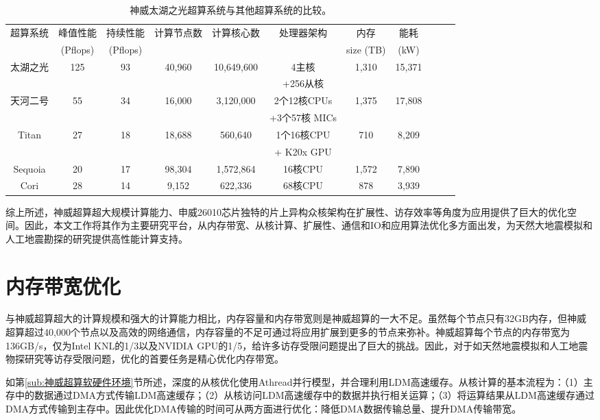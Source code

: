 \documentclass[degree=doctor]{thuthesis}
\begin{document}
\begin{table}[ht]
\footnotesize
\caption{神威太湖之光超算系统与其他超算系统的比较。}
\label{tb:system-comp}
\begin{tabular*}{\textwidth}{ccccccccccc}
\hline\hline
  超算系统 & 峰值性能 & 持续性能 & 计算节点数 & 计算核心数 & 处理器架构 & 内存 & 能耗\\
  & (Pflops) & (Pflops) &&&& size (TB) & (kW)\\\hline
  太湖之光 & 125  & 93 & 40,960 & 10,649,600 & 4主核 & 1,310 & 15,371 \\
  & & & & & +256从核 \\\hline
  天河二号 & 55 & 34 & 16,000 & 3,120,000 & 2个12核CPUs & 1,375 & 17,808\\
  & & & & & +3个57核 MICs \\\hline
  Titan & 27 & 18 & 18,688 & 560,640 & 1个16核CPU & 710 & 8,209 \\
  & & & & &+ K20x GPU \\\hline
  Sequoia & 20 & 17 & 98,304 & 1,572,864 & 16核CPU & 1,572 & 7,890 \\\hline
  Cori & 28 & 14 & 9,152 & 622,336 & 68核CPU & 878 & 3,939\\\hline
\hline
\end{tabular*}
\end{table}

综上所述，神威超算超大规模计算能力、申威26010芯片独特的片上异构众核架构在扩展性、访存效率等角度为应用提供了巨大的优化空间。因此，本文工作将其作为主要研究平台，从内存带宽、从核计算、扩展性、通信和IO和应用算法优化多方面出发，为天然大地震模拟和人工地震勘探的研究提供高性能计算支持。

\section{内存带宽优化}
\label{sec:内存带宽优化}

与神威超算超大的计算规模和强大的计算能力相比，内存容量和内存带宽则是神威超算的一大不足。虽然每个节点只有32GB内存，但神威超算超过40,000个节点以及高效的网络通信，内存容量的不足可通过将应用扩展到更多的节点来弥补。神威超算每个节点的内存带宽为136GB/s，仅为Intel KNL的1/3以及NVIDIA GPU的1/5，给许多访存受限问题提出了巨大的挑战。因此，对于如天然地震模拟和人工地震物探研究等访存受限问题，优化的首要任务是精心优化内存带宽。

如第\ref{sub:神威超算软硬件环境}节所述，深度的从核优化使用Athread并行模型，并合理利用LDM高速缓存。从核计算的基本流程为：（1）主存中的数据通过DMA方式传输LDM高速缓存；（2）从核访问LDM高速缓存中的数据并执行相关运算；（3）将运算结果从LDM高速缓存通过DMA方式传输到主存中。因此优化DMA传输的时间可从两方面进行优化：降低DMA数据传输总量、提升DMA传输带宽。
\end{document}
